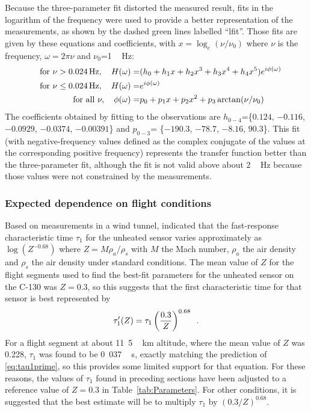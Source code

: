 \documentclass[amt, manuscript]{copernicus}
\begin{document}
Because the three-parameter fit distorted the measured result, fits in
the logarithm of the frequency were used to provide a better
representation of the measurements, as shown by the dashed green lines
labelled ``lfit''. Those fits are given by these equations and
coefficients, with \(x=\log_{e}(\nu/\nu_{0})\) where \(\nu\) is the
frequency, \(\omega=2\pi\nu\) and \(\nu_{0}\)=\unit{1\,Hz}:
\begin{align}
\hskip1em\mathrm{for}\ \nu>0.024\,\mathrm{Hz},\quad H(\omega)= & (h_{0}+h_{1}x+h_{2}x^{3}+h_{3}x^{4}+h_{4}x^{5})e^{i\phi(\omega)}{\label{eq:lfitH}} \\
\hskip1em\mathrm{for}\ \nu\leq0.024\,\mathrm{Hz},\quad H(\omega)= & e^{i\phi(\omega)} \\
\hskip1em\mathrm{for}\ \mathrm{all}\ \nu,\quad\phi(\omega)= & p_{0}+p_{1}x+p_{2}x^{2}+p_{3}\arctan(\nu/\nu_{0})
\end{align} The coefficients obtained by fitting to the observations are
\(h_{0-4}\)=\{\(0.124\), \(-0.116\), \(-0.0929\), \(-0.0374\),
\(-0.00391\)\} and \(p_{0-3}\)= \{\(-190.3\), \(-78.7\), \(-8.16\),
\(90.3\)\}. This fit (with negative-frequency values defined as the
complex conjugate of the values at the corresponding positive frequency)
represents the transfer function better than the three-parameter fit,
although the fit is not valid above about \unit{2\,Hz} because those
values were not constrained by the measurements.

\subsubsection{\texorpdfstring{Expected dependence on flight
conditions\label{subsec:Expected-dependence-on}}{Expected dependence on flight conditions}}

Based on measurements in a wind tunnel, \citet{GoodrichTR5755} indicated
that the fast-response characteristic time \(\tau_{1}\) for the unheated
sensor varies approximately as \(\log(Z^{-0.68})\) where
\(Z=M\rho_{a}/\rho_{s}\) with \(M\) the Mach number, \(\rho_{a}\) the
air density and \(\rho_{s}\) the air density under standard conditions.
The mean value of \(Z\) for the flight segments used to find the
best-fit parameters for the unheated sensor on the C-130 was \(Z=0.3\),
so this suggests that the first characteristic time for that sensor is
best represented by \begin{equation}
\tau_{1}^{\prime}(Z)=\tau_{1}\left(\frac{0.3}{Z}\right)^{0.68}\,\,\,.{\label{eq:tau1prime}}
\end{equation} For a flight segment at about \unit{11.5\,km} altitude,
where the mean value of \(Z\) was 0.228, \(\tau_1\) was found to be
\unit{0.037\,s}, exactly matching the prediction of
\eqref{eq:tau1prime}, so this provides some limited support for that
equation. For these reasons, the values of \(\tau_1\) found in preceding
sections have been adjusted to a reference value of \(Z=0.3\) in
Table~\ref{tab:Parameters}. For other conditions, it is suggested that
the best estimate will be to multiply \(\tau_{1}\) by
\((0.3/Z)^{0.68}\).
\end{document}
